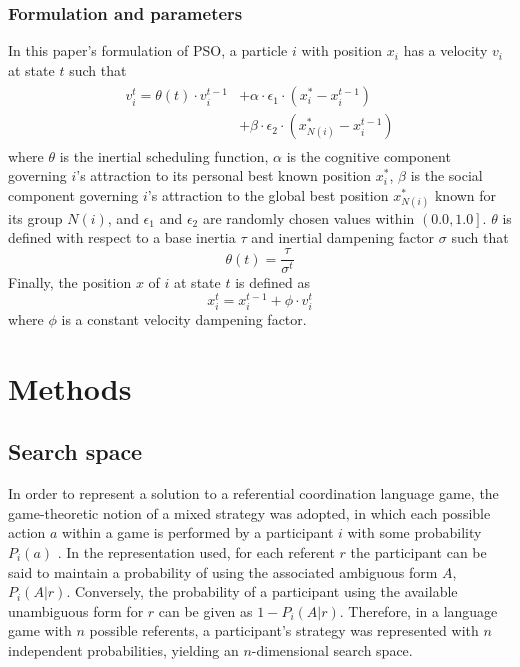 \documentclass[11pt]{article}
\begin{document}
\subsubsection{Formulation and parameters}
\label{sec:2.2.3}
In this paper's formulation of PSO, a particle $i$ with position $x_i$ has a velocity $v_i$ at state $t$ such that 
\begin{multline}
\begin{split}
v_i^t = \theta(t) \cdot v_i^{t-1} & + \alpha \cdot \epsilon_1 \cdot (x_i^* - x_i^{t-1}) \\
                                  & + \beta \cdot \epsilon_2 \cdot (x_{N(i)}^* - x_i^{t-1})
\end{split}
\end{multline}
where $\theta$ is the inertial scheduling function, $\alpha$ is the cognitive component governing $i$'s attraction to its personal best known position $x_i^*$, $\beta$ is the social component governing $i$'s attraction to the global best position $x_{N(i)}^*$ known for its group $N(i)$, and $\epsilon_1$ and $\epsilon_2$ are randomly chosen values within $\left(0.0, 1.0\right]$. $\theta$ is defined with respect to a base inertia $\tau$ and inertial dampening factor $\sigma$ such that
\begin{equation}
\theta(t) = \frac{\tau}{\sigma^t} 
\end{equation}
Finally, the position $x$ of $i$ at state $t$ is defined as
\begin{equation}
x_i^t = x_i^{t-1} + \phi \cdot v_i^t 
\end{equation}
where $\phi$ is a constant velocity dampening factor.



\section{Methods}
\subsection{Search space}
\label{sec:search_space}
In order to represent a solution to a referential coordination language game, the game-theoretic notion of a mixed strategy was adopted, in which each possible action $a$ within a game is performed by a participant $i$ with some probability $P_i(a)$ \citep{benz2005}. In the representation used, for each referent $r$ the participant can be said to maintain a probability of using the associated ambiguous form $A$, $P_i(A|r)$. Conversely, the probability of a participant using the available unambiguous form for $r$ can be given as $1 - P_i(A|r)$. Therefore, in a language game with $n$ possible referents, a participant's strategy was represented with $n$ independent probabilities, yielding an $n$-dimensional search space. 
\end{document}
